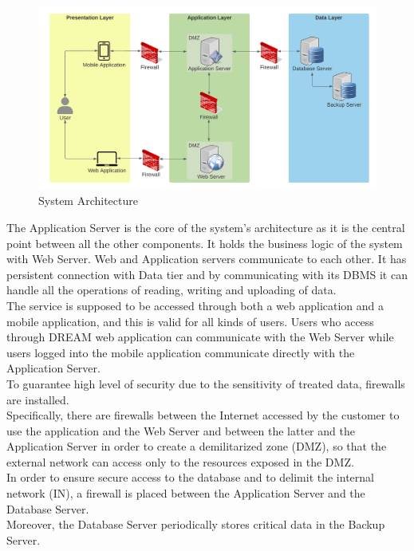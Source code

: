 \begin{center}
    \begin{figure}[h!]
  \includegraphics[width=\textwidth,height=\textheight,keepaspectratio]{./Images/System Architecture.png}
  \caption{System Architecture}
\end{figure}
\end{center}

The Application Server is the core of the system’s architecture as it is the central point between all the other components. It holds the business logic of the system with Web Server. Web and Application servers communicate to each other. It has persistent connection with Data tier and by communicating with its DBMS it can handle all the operations of reading, writing and uploading of data.\\

The service is supposed to be accessed through both a web application and a mobile application, and this is valid for all kinds of users. Users who access through DREAM web application can communicate with the Web Server while users logged into the mobile application communicate directly with the Application Server.\\

To guarantee high level of security due to the sensitivity of treated data, firewalls are installed.\\
Specifically, there are firewalls between the Internet accessed by the customer to use the application and the Web Server and between the latter and the Application Server in order to create a demilitarized zone (DMZ), so that the external network can access only to the resources exposed in the DMZ. \\
In order to ensure secure access to the database and to delimit the internal network (IN), a firewall is placed between the Application Server and the Database Server.\\
Moreover, the Database Server periodically stores critical data in the Backup Server. \\

